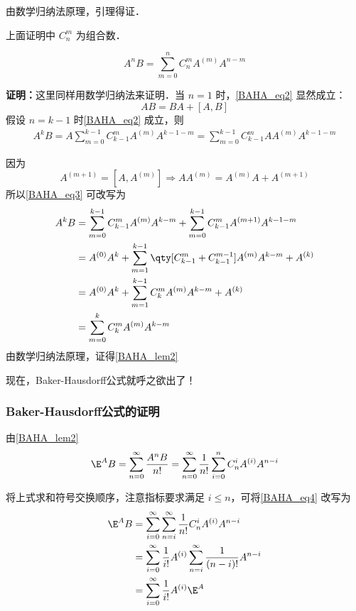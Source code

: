由数学归纳法原理，引理得证．

上面证明中 $C_n^m$ 为组合数．
\begin{lemma}{}\label{BAHA_lem2}
\begin{equation}\label{BAHA_eq2}
A^nB=\sum_{m=0}^{n}C_{n}^mA^{(m)}A^{n-m}
\end{equation}
\end{lemma}
\textbf{证明：}这里同样用数学归纳法来证明．当 $n=1$ 时，\autoref{BAHA_eq2} 显然成立：
\begin{equation}
AB=BA+[A,B]
\end{equation}
假设 $n=k-1$ 时\autoref{BAHA_eq2} 成立，则
\begin{equation}\label{BAHA_eq3}
\begin{aligned}
A^{k}B=A\sum_{m=0}^{k-1}C_{k-1}^mA^{(m)}A^{k-1-m}=\sum_{m=0}^{k-1}C_{k-1}^mAA^{(m)}A^{k-1-m}
\end{aligned}
\end{equation}

因为
\begin{equation}
A^{(m+1)}=[A,A^{(m)}]\Rightarrow AA^{(m)}=A^{(m)}A+A^{(m+1)}
\end{equation}
所以\autoref{BAHA_eq3} 可改写为
\begin{equation}
\begin{aligned}
A^k B&=\sum_{m=0}^{k-1}C_{k-1}^mA^{(m)}A^{k-m}+\sum_{m=0}^{k-1}C_{k-1}^mA^{(m+1)}A^{k-1-m}\\
&=A^{(0)}A^{k}+\sum_{m=1}^{k-1}\qty[C_{k-1}^m+C_{k-1}^{m-1}]A^{(m)}A^{k-m}+A^{(k)}\\
&=A^{(0)}A^{k}+\sum_{m=1}^{k-1}C_{k}^mA^{(m)}A^{k-m}+A^{(k)}\\
&=\sum_{m=0}^{k}C_{k}^mA^{(m)}A^{k-m}
\end{aligned}
\end{equation}
由数学归纳法原理，证得\autoref{BAHA_lem2} 

现在，Baker-Hausdorff公式就呼之欲出了！
\subsubsection{Baker-Hausdorff公式的证明}
由\autoref{BAHA_lem2} 
\begin{equation}\label{BAHA_eq4}
\E^A B=\sum_{n=0}^{\infty}\frac{A^nB}{n!}=\sum_{n=0}^{\infty}\frac{1}{n!}\sum_{i=0}^{n}C_{n}^iA^{(i)}A^{n-i}
\end{equation}

将上式求和符号交换顺序，注意指标要求满足 $i\leq n$，可将\autoref{BAHA_eq4} 改写为
\begin{equation}
\begin{aligned}
\E^A B&=\sum_{i=0}^{\infty}\sum_{n=i}^{\infty}\frac{1}{n!}C_{n}^iA^{(i)}A^{n-i}\\
&=\sum_{i=0}^{\infty}\frac{1}{i!}A^{(i)}\sum_{n=i}^{\infty}\frac{1}{(n-i)!}A^{n-i}\\
&=\sum_{i=0}^{\infty}\frac{1}{i!}A^{(i)}\E^A
\end{aligned}
\end{equation}

